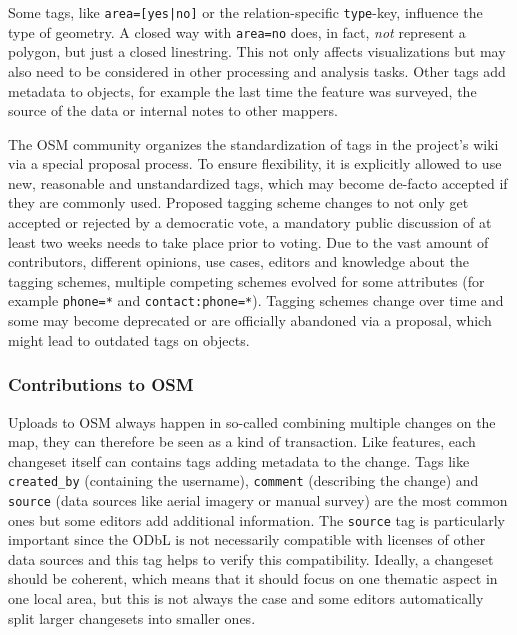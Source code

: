 			Some tags, like \texttt{area=[yes|no]} or the relation-specific \texttt{type}-key, influence the type of geometry.
			A closed way with \texttt{area=no} does, in fact, \textit{not} represent a polygon, but just a closed linestring.
			This not only affects visualizations but may also need to be considered in other processing and analysis tasks.
			Other tags add metadata to objects, for example the last time the feature was surveyed, the source of the data or internal notes to other mappers.
			
			The OSM community organizes the standardization of tags in the project's wiki via a special proposal process\cite{osm-wiki-proposal-process}.
			To ensure flexibility, it is explicitly allowed to use new, reasonable and unstandardized tags, which may become de-facto accepted if they are commonly used.
			Proposed tagging scheme changes to not only get accepted or rejected by a democratic vote, a mandatory public discussion of at least two weeks needs to take place prior to voting.
			Due to the vast amount of contributors, different opinions, use cases, editors and knowledge about the tagging schemes, multiple competing schemes evolved for some attributes (for example \texttt{phone=*} and \texttt{contact:phone=*}).
			Tagging schemes change over time and some may become deprecated or are officially abandoned via a proposal, which might lead to outdated tags on objects.
			
		\subsubsection{Contributions to OSM}
		
			Uploads to OSM always happen in so-called  combining multiple changes on the map\cite{osm-wiki-changeset}, they can therefore be seen as a kind of transaction.
			Like features, each changeset itself can contains tags adding metadata to the change.
			Tags like \texttt{created\_by} (containing the username), \texttt{comment} (describing the change) and \texttt{source} (data sources like aerial imagery or manual survey) are the most common ones but some editors add additional information.
			The \texttt{source} tag is particularly important since the ODbL is not necessarily compatible with licenses of other data sources and this tag helps to verify this compatibility.
			Ideally, a changeset should be coherent, which means that it should focus on one thematic aspect in one local area, but this is not always the case and some editors automatically split larger changesets into smaller ones.
			
